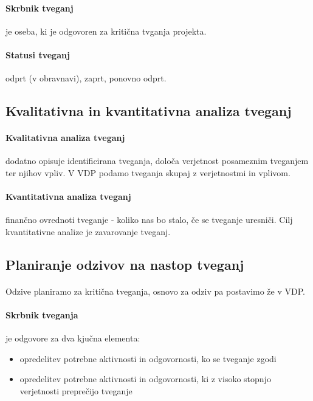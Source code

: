 \documentclass[a4paper,12pt]{report}
\begin{document}
         \paragraph{Skrbnik tveganj} je oseba, ki je odgovoren za kritična tvganja projekta.
         \paragraph{Statusi tveganj} odprt (v obravnavi), zaprt, ponovno odprt.

      \subsection{Kvalitativna in kvantitativna analiza tveganj}
         \paragraph{Kvalitativna analiza tveganj} dodatno opisuje identificirana tveganja, določa verjetnost posameznim tveganjem ter njihov vpliv. V VDP podamo tveganja skupaj z verjetnostmi in vplivom.
         \paragraph{Kvantitativna analiza tveganj} finančno ovrednoti tveganje - koliko nas bo stalo, če se tveganje uresniči. Cilj kvantitativne analize je zavarovanje tveganj.

      \subsection{Planiranje odzivov na nastop tveganj}
         \paragraph{} Odzive planiramo za kritična tveganja, osnovo za odziv pa postavimo že v VDP.
         \paragraph{Skrbnik tveganja} je odgovore za dva kjučna elementa:
            \begin{itemize}
               \item opredelitev potrebne aktivnosti in odgovornosti, ko se tveganje zgodi
               \item opredelitev potrebne aktivnosti in odgovornosti, ki z visoko stopnjo verjetnosti preprečijo tveganje
            \end{itemize}
\end{document}
